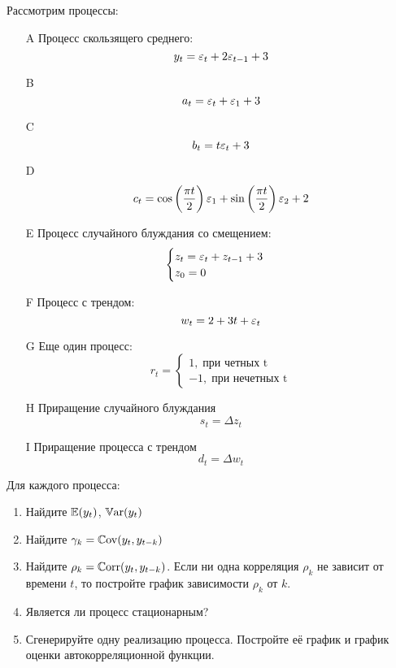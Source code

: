 \begin{problem}
Рассмотрим процессы:

\begin{enumerate}
\item[A] Процесс скользящего среднего:
\[
y_t=\varepsilon_t+2\varepsilon_{t-1}+3
\]

\item[B]
\[
a_t=\varepsilon_t+\varepsilon_1 + 3
\]

\item[C]
\[
b_t=t\varepsilon_t + 3
\]

\item[D]
\[
c_t=\cos\left(\frac{\pi t}{2}\right)\varepsilon_1 + \sin\left(\frac{\pi t}{2}\right)\varepsilon_2 + 2
\]

\item[E] Процесс случайного блуждания со смещением:
\[
\begin{cases}
z_t=\varepsilon_t+z_{t-1}+3 \\
z_0=0
\end{cases}
\]

\item[F] Процесс с трендом:
\[
w_t=2+3t+\varepsilon_t
\]

\item[G] Еще один процесс:
\[
r_t=\begin{cases}
1, \; \text{при четных t} \\
-1, \; \text{при нечетных t}
\end{cases}
\]

\item[H] Приращение случайного блуждания
\[
s_t=\Delta z_t
\]

\item[I] Приращение процесса с трендом
\[
d_t=\Delta w_t
\]
\end{enumerate}

Для каждого процесса:

\begin{enumerate}
\item Найдите $\operatorname{\mathbb{E}}(y_t)$, $\operatorname{\mathbb{V}\mathrm{ar}}(y_t)$
\item Найдите $\gamma_k = \operatorname{\mathbb{C}\mathrm{ov}}(y_t, y_{t-k})$
\item Найдите $\rho_k = \operatorname{\mathbb{C}\mathrm{orr}}(y_t,y_{t-k})$. 
Если ни одна корреляция $\rho_k$ не зависит от времени $t$, то постройте график зависимости $\rho_k$ от $k$.
\item Является ли процесс стационарным?
\item Сгенерируйте одну реализацию процесса. Постройте её график и график оценки автокорреляционной функции.
\end{enumerate}



\end{problem}
